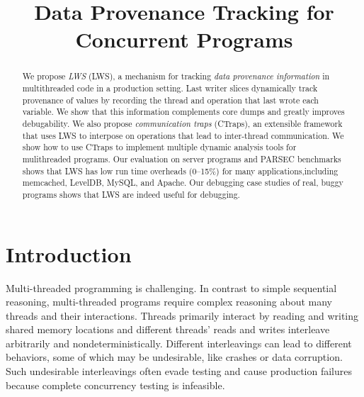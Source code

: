 \documentclass[pageno,nohyperref]{jpaper}
\title{Data Provenance Tracking for Concurrent Programs}
\date{}
\newcommand{\ctraps}{CTraps\xspace}
\newcommand{\lws}{LWS\xspace}
\begin{document}
\setlength{\pdfpageheight}{\paperheight}
\setlength{\pdfpagewidth}{\paperwidth}

\maketitle

\thispagestyle{empty}
\begin{abstract}
We propose {\em \lws} (\lws), a mechanism for tracking {\em data
provenance information} in multithreaded code in a production setting.  Last
writer slices dynamically track provenance of values by recording the thread
and operation that last wrote each variable. We show that this information
complements core dumps and greatly improves debugability. We also propose {\em
communication traps} (\ctraps), an extensible framework that uses \lws to interpose on operations that lead to inter-thread communication. We
show how to use \ctraps to implement multiple dynamic analysis tools for
mulithreaded programs. Our evaluation on server programs and PARSEC benchmarks
shows that \lws has low run time overheads (0--15\%) for many
applications,including  memcached, LevelDB, MySQL, and Apache. Our debugging
case studies of real, buggy programs shows that \lws are indeed
useful for debugging.  
\end{abstract}

\section{Introduction}
Multi-threaded programming is challenging.  In contrast to simple sequential
reasoning, multi-threaded programs require complex reasoning about many threads
and their interactions.  Threads primarily interact by reading and writing
shared memory locations and different threads' reads and writes interleave
arbitrarily and nondeterministically. Different interleavings can lead to
different behaviors, some of which may be undesirable, like crashes or data
corruption. Such undesirable interleavings often evade testing and cause
production failures because complete concurrency testing is infeasible.
\end{document}
